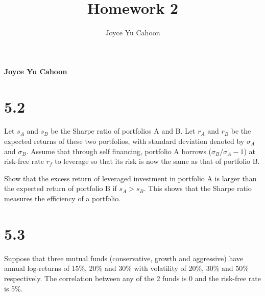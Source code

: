 \documentclass[11pt,]{article}
\title{Homework 2  }
\author{\Large Joyce Yu Cahoon\vspace{0.05in} \newline\normalsize\emph{}  }
\date{}
\newcommand*{\authorfont}{\fontfamily{phv}\selectfont}
\begin{document}
%

{%
\setlength{\parindent}{0pt}
\thispagestyle{plain}
{\fontsize{18}{20}\selectfont\raggedright 
\maketitle  %

}

{
  \vskip 13.5pt\relax \normalsize\fontsize{11}{12} 
  \textbf{\authorfont Joyce Yu Cahoon} \hskip 15pt \emph{\small }   
  
}

}






\vskip 6.5pt


\noindent  \section{5.2}\label{section}

Let \(s_A\) and \(s_B\) be the Sharpe ratio of portfolios A and B. Let
\(r_A\) and \(r_B\) be the expected returns of these two portfolios,
with standard deviation denoted by \(\sigma_A\) and \(\sigma_B\). Assume
that through self financing, portfolio A borrows
(\(\sigma_B/\sigma_A-1\)) at risk-free rate \(r_f\) to leverage so that
its risk is now the same as that of portfolio B.

Show that the excess return of leveraged investment in portfolio A is
larger than the expected return of portfolio B if \(s_A > s_B\). This
shows that the Sharpe ratio measures the efficiency of a portfolio.

\newpage 

\section{5.3}\label{section-1}

Suppose that three mutual funds (conservative, growth and aggressive)
have annual log-returns of 15\%, 20\% and 30\% with volatility of 20\%,
30\% and 50\% respectively. The correlation between any of the 2 funds
is 0 and the risk-free rate is 5\%.
\end{document}
